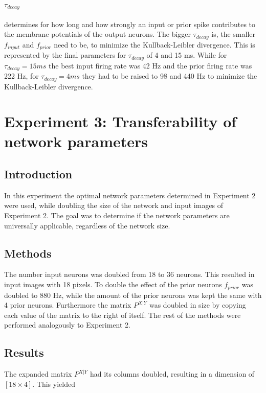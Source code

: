 \paragraph{$\tau_{decay}$} determines for how long and how strongly an input or prior spike contributes to the membrane potentials of the output neurons. The bigger $\tau_{decay}$ is, the smaller $f_{input}$ and $f_{prior}$ need to be, to minimize the Kullback-Leibler divergence. This is represented by the final parameters for $\tau_{decay}$ of 4 and 15 ms. While for $\tau_{decay} = 15 ms$ the best input firing rate was 42 Hz and the prior firing rate was 222 Hz, for $\tau_{decay} = 4 ms$ they had to be raised to 98 and 440 Hz to minimize the Kullback-Leibler divergence.

\section{Experiment 3: Transferability of network parameters}
\label{section:1DDoubleSize}

\subsection{Introduction}
In this experiment the optimal network parameters determined in Experiment 2 were used, while doubling the size of the network and input images of Experiment 2. The goal was to determine if the network parameters are universally applicable, regardless of the network size.

\subsection{Methods}
The number input neurons was doubled from 18 to 36 neurons. This resulted in input images with 18 pixels. To double the effect of the prior neurons $f_{prior}$ was doubled to 880 Hz, while the amount of the prior neurons was kept the same with 4 prior neurons. Furthermore the matrix $P^{X|Y}$ was doubled in size by copying each value of the matrix to the right of itself.  The rest of the methods were performed analogously to Experiment 2.

\subsection{Results}

The expanded matrix $P^{X|Y}$ had its columns doubled, resulting in a dimension of $[18 \times 4]$. This yielded

